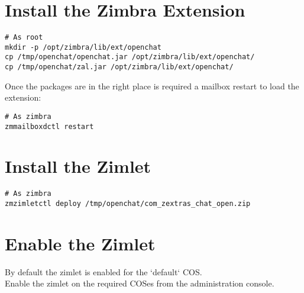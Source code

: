\section{Install the Zimbra Extension}
\begin{verbatim}
# As root
mkdir -p /opt/zimbra/lib/ext/openchat
cp /tmp/openchat/openchat.jar /opt/zimbra/lib/ext/openchat/
cp /tmp/openchat/zal.jar /opt/zimbra/lib/ext/openchat/
\end{verbatim}
Once the packages are in the right place is required a mailbox restart to load the extension:
\begin{verbatim}
# As zimbra
zmmailboxdctl restart
\end{verbatim}

\section{Install the Zimlet}
\begin{verbatim}
# As zimbra
zmzimletctl deploy /tmp/openchat/com_zextras_chat_open.zip
\end{verbatim}

\section{Enable the Zimlet}
By default the zimlet is enabled for the `default` COS.\\
Enable the zimlet on the required COSes from the administration console.